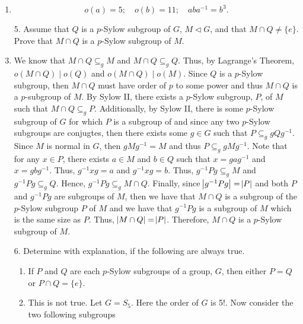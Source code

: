\documentclass[12pt]{article}
\makeatletter
\theoremstyle{definition}
\theoremstyle{remark}
\renewenvironment{proof}[1][\proofname]{\par
  \pushQED{\qed}%
  \normalfont \topsep6\p@\@plus6\p@\relax
  \list{}{\leftmargin=0mm
          \rightmargin=4mm
          \settowidth{\itemindent}{\itshape#1}%
          \labelwidth=\itemindent
          \parsep=0pt \listparindent=\parindent 
  }
  \item[\hskip\labelsep
        \itshape
    #1\@addpunct{.}]\ignorespaces
}{%
  \popQED\endlist\@endpefalse
}
\let\oldproofname=\proofname
\renewcommand{\proofname}{\bf{\textit{\oldproofname}}}
\makeatother
\begin{document}
\begin{enumerate}[leftmargin=*]
\begin{proof}
                    \begin{equation*}
                        o(a)=5;\quad o(b)=11;\quad aba^{-1}=b^3.
                    \end{equation*}        
            \end{proof}
                
    \newpage
    
        \item[5.] Assume that $Q$ is a $p$-Sylow subgroup of $G$, $M\triangleleft G$, and that $M\cap Q\neq\{e\}$. Prove that $M\cap Q$ is a $p$-Sylow subgroup of $M$.
            \begin{proof}
                We know that $M\cap Q\subseteq_g M$ and $M\cap Q\subseteq_g Q$. Thus, by Lagrange's Theorem, $o(M\cap Q)\mid o(Q)$ and $o(M\cap Q)\mid o(M)$. Since $Q$ is a $p$-Sylow subgroup, then $M\cap Q$ must have order of $p$ to some power and thus $M\cap Q$ is a $p$-subgroup of $M$. By Sylow II, there exists a $p$-Sylow subgroup, $P$, of $M$ such that $M\cap Q\subseteq_g P$. Additionally, by Sylow II, there is some $p$-Sylow subgroup of $G$ for which $P$ is a subgroup of and since any two $p$-Sylow subgroups are conjugtes, then there exists some $g\in G$ such that $P\subseteq_g gQg^{-1}$. Since $M$ is normal in $G$, then $gMg^{-1}=M$ and thus $P\subseteq_g gMg^{-1}$. Note that for any $x\in P$, there exists $a\in M$ and $b\in Q$ such that $x=gag^{-1}$ and $x=gbg^{-1}$. Thus, $g^{-1}xg=a$ and $g^{-1}xg=b$. Thus, $g^{-1}Pg\subseteq_g M$ and $g^{-1}Pg\subseteq_g Q$. Hence, $g^{-1}Pg\subseteq_g M\cap Q$. Finally, since $\abs{g^{-1}Pg}=\abs{P}$ and both $P$ and $g^{-1}Pg$ are subgroups of $M$, then we have that $M\cap Q$ is a subgroup of the $p$-Sylow subgroup $P$ of $M$ and we have that $g^{-1}Pg$ is a subgroup of $M$ which is the same size as $P$. Thus, $\abs{M\cap Q}=\abs{P}$. Therefore, $M\cap Q$ is a $p$-Sylow subgroup of $M$.
            \end{proof}
            
        \item[6.] Determine with explanation, if the following are always true.
            \begin{enumerate}[label=(\alph*)]
                \item If $P$ and $Q$ are each $p$-Sylow subgroups of a group, $G$, then either $P=Q$ or $P\cap Q=\{e\}$.
                    \begin{proof}
                        This is not true. Let $G=S_5$. Here the order of $G$ is 5!. Now consider the two following subgroups
                        

\end{proof}
\end{enumerate}
\end{enumerate}
\end{document}
